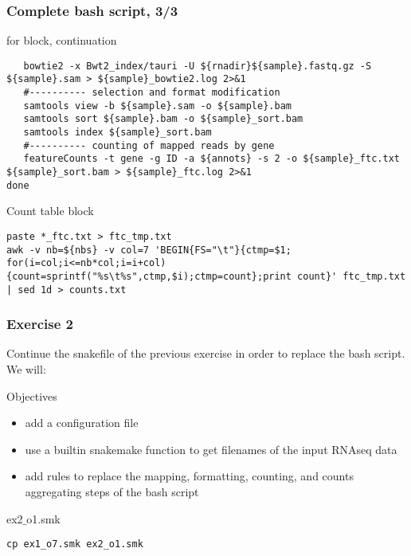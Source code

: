 \begin{frame}[containsverbatim]
\frametitle{Complete bash script, 3/3}
\begin{exampleblock}{for block, continuation}
\begin{lstlisting}
   bowtie2 -x Bwt2_index/tauri -U ${rnadir}${sample}.fastq.gz -S ${sample}.sam > ${sample}_bowtie2.log 2>&1
   #---------- selection and format modification
   samtools view -b ${sample}.sam -o ${sample}.bam
   samtools sort ${sample}.bam -o ${sample}_sort.bam
   samtools index ${sample}_sort.bam
   #---------- counting of mapped reads by gene
   featureCounts -t gene -g ID -a ${annots} -s 2 -o ${sample}_ftc.txt ${sample}_sort.bam > ${sample}_ftc.log 2>&1
done
\end{lstlisting}
\end{exampleblock}
\begin{exampleblock}{Count table block}
\begin{lstlisting}
paste *_ftc.txt > ftc_tmp.txt
awk -v nb=${nbs} -v col=7 'BEGIN{FS="\t"}{ctmp=$1; for(i=col;i<=nb*col;i=i+col){count=sprintf("%s\t%s",ctmp,$i);ctmp=count};print count}' ftc_tmp.txt | sed 1d > counts.txt
\end{lstlisting}
\end{exampleblock}
\end{frame}
\begin{frame}[containsverbatim]
\frametitle{Exercise 2}
Continue the snakefile of the previous exercise in order to replace the bash script. \\
We will:
\begin{exampleblock}{Objectives}
\begin{itemize}
    \item add a configuration file
    \item use a builtin snakemake function to get filenames of the input RNAseq data
    \item add rules to replace the mapping, formatting, counting, and counts aggregating steps of the bash script
\end{itemize}
\end{exampleblock}
\begin{exampleblock}{ex2$\_$o1.smk}
\begin{lstlisting}
cp ex1_o7.smk ex2_o1.smk
\end{lstlisting}
\end{exampleblock}
\end{frame}
